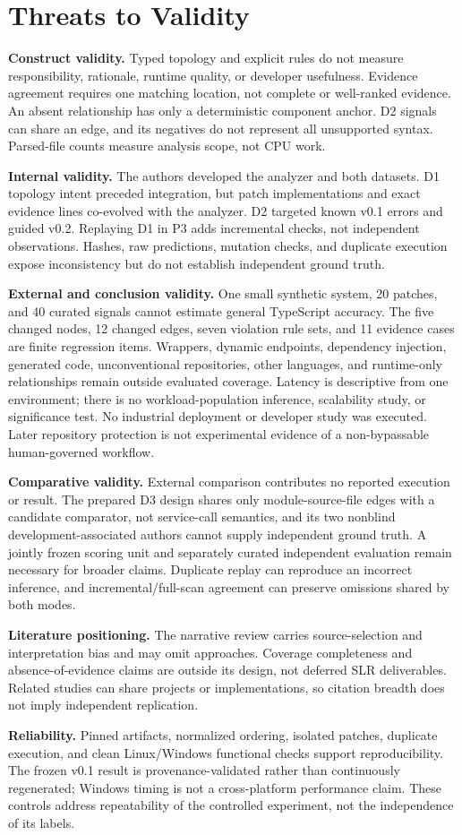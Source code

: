 \section{Threats to Validity}
\textbf{Construct validity.} Typed topology and explicit rules do not measure responsibility, rationale, runtime quality, or developer usefulness. Evidence agreement requires one matching location, not complete or well-ranked evidence. An absent relationship has only a deterministic component anchor. D2 signals can share an edge, and its negatives do not represent all unsupported syntax. Parsed-file counts measure analysis scope, not CPU work.

\textbf{Internal validity.} The authors developed the analyzer and both datasets. D1 topology intent preceded integration, but patch implementations and exact evidence lines co-evolved with the analyzer. D2 targeted known v0.1 errors and guided v0.2. Replaying D1 in P3 adds incremental checks, not independent observations. Hashes, raw predictions, mutation checks, and duplicate execution expose inconsistency but do not establish independent ground truth.

\textbf{External and conclusion validity.} One small synthetic system, 20 patches, and 40 curated signals cannot estimate general TypeScript accuracy. The five changed nodes, 12 changed edges, seven violation rule sets, and 11 evidence cases are finite regression items. Wrappers, dynamic endpoints, dependency injection, generated code, unconventional repositories, other languages, and runtime-only relationships remain outside evaluated coverage. Latency is descriptive from one environment; there is no workload-population inference, scalability study, or significance test. No industrial deployment or developer study was executed. Later repository protection is not experimental evidence of a non-bypassable human-governed workflow.

\textbf{Comparative validity.} External comparison contributes no reported execution or result. The prepared D3 design shares only module-source-file edges with a candidate comparator, not service-call semantics, and its two nonblind development-associated authors cannot supply independent ground truth. A jointly frozen scoring unit and separately curated independent evaluation remain necessary for broader claims. Duplicate replay can reproduce an incorrect inference, and incremental/full-scan agreement can preserve omissions shared by both modes.

\textbf{Literature positioning.} The narrative review carries source-selection and interpretation bias and may omit approaches. Coverage completeness and absence-of-evidence claims are outside its design, not deferred SLR deliverables. Related studies can share projects or implementations, so citation breadth does not imply independent replication.

\textbf{Reliability.} Pinned artifacts, normalized ordering, isolated patches, duplicate execution, and clean Linux/Windows functional checks support reproducibility. The frozen v0.1 result is provenance-validated rather than continuously regenerated; Windows timing is not a cross-platform performance claim. These controls address repeatability of the controlled experiment, not the independence of its labels.

